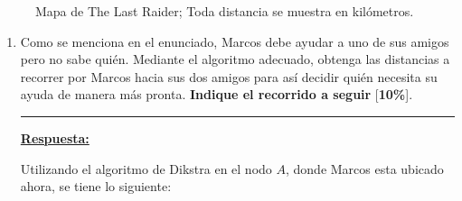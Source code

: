 \documentclass[legalpaper,10pt]{article}
\begin{document}
\begin{enumerate}
\begin{minipage}[b]{0.53\textwidth}
\begin{figure}[H]
\caption{Mapa de The Last Raider; Toda distancia se muestra en kilómetros.}
\label{florencia}
\end{figure}
\end{minipage}

\vspace{0.2cm}

\begin{enumerate}
  \item Como se menciona en el enunciado, Marcos debe ayudar a uno de sus amigos pero no sabe quién. Mediante el algoritmo adecuado, obtenga las distancias a recorrer por Marcos hacia sus dos amigos para así decidir quién necesita su ayuda de manera más pronta. \textbf{Indique el recorrido a seguir} [\textbf{10\%}].

  \rule{5cm}{0.4pt}

  \underline{\textbf{Respuesta:}}

  Utilizando el algoritmo de Dikstra en el nodo $A$, donde Marcos esta ubicado ahora, se tiene lo siguiente: \\


\end{enumerate}
\end{enumerate}
\end{document}
